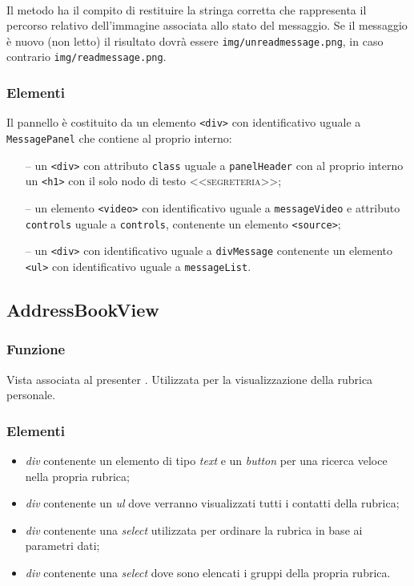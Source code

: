 \begin{description}
  \item{}\\
  Il metodo ha il compito di restituire la stringa corretta che rappresenta il percorso relativo dell'immagine associata allo stato del messaggio. Se il messaggio è nuovo (non letto) il risultato dovrà essere \verb'img/unreadmessage.png', in caso contrario  \verb'img/readmessage.png'.
  
\end{description}

\subsubsection*{Elementi}
Il pannello è costituito da un elemento \verb'<div>' con identificativo uguale a \verb'MessagePanel' che contiene al proprio interno:
\begin{itemize}
  \item[--] un \verb'<div>' con attributo \verb'class' uguale a \verb'panelHeader' con al proprio interno un \verb'<h1>' con il solo nodo di testo \textsc{<<segreteria>>};
  \item[--] un elemento \verb'<video>' con identificativo uguale a \verb'messageVideo' e attributo \verb'controls' uguale a \verb'controls', contenente un elemento \verb'<source>';
  \item[--] un \verb'<div>' con identificativo uguale a \verb'divMessage' contenente un elemento \verb'<ul>' con identificativo uguale a \verb'messageList'.
\end{itemize}


\subsection{AddressBookView}
\subsubsection*{Funzione}
Vista associata al presenter . Utilizzata per la visualizzazione della rubrica personale.
\subsubsection*{Elementi}
\begin{itemize}
\item \textit{div} contenente un elemento di tipo \textit{text} e un \textit{button} per una ricerca veloce nella propria rubrica;
\item \textit{div} contenente un \textit{ul} dove verranno visualizzati tutti i contatti della rubrica;
\item \textit{div} contenente una \textit{select} utilizzata per ordinare la rubrica in base ai parametri dati;
\item \textit{div} contenente una \textit{select} dove sono elencati i gruppi della propria rubrica.
\end{itemize}

